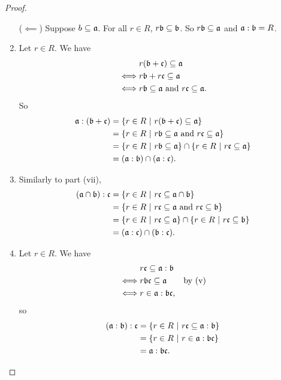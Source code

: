 \begin{proof}
\begin{enumerate}[label=(\roman*)]
      ($\impliedby$) Suppose $b \subseteq \frak a$.
      For all $r \in R$, $r \frak b \subseteq \frak b$.
      So $r \frak b \subseteq \frak a$ and $\frak a : \frak b = R$.
      
    \item
      Let $r \in R$. We have
      \begin{align*}
           & r(\frak b + \frak c) \subseteq \frak a \\
      \iff & r \frak b + r \frak c \subseteq \frak a \\
      \iff & r \frak b \subseteq \frak a \text{ and } r \frak c \subseteq \frak a.
      \end{align*}
      So
      \begin{align*}
        \frak a : (\frak b + \frak c)
          &= \{ r \in R ~|~ r(\frak b + \frak c) \subseteq \frak a \} \\
          &= \{ r \in R ~|~ r \frak b \subseteq \frak a \text{ and } r \frak c \subseteq \frak a \} \\
          &= \{ r \in R ~|~ r \frak b \subseteq \frak a \} \cap \{ r \in R ~|~ r \frak c \subseteq \frak a \} \\
          &= (\frak a : \frak b) \cap (\frak a : \frak c).
      \end{align*}
    
    \item
      Similarly to part (vii),
      \begin{align*}
        (\frak a \cap \frak b) : \frak c
          &= \{ r \in R ~|~ r \frak c \subseteq \frak a \cap \frak b \} \\
          &= \{ r \in R ~|~ r \frak c \subseteq \frak a \text{ and } r \frak c \subseteq \frak b \} \\
          &= \{ r \in R ~|~ r \frak c \subseteq \frak a \} \cap \{ r \in R ~|~ r \frak c \subseteq \frak b \} \\
          &= (\frak a : \frak c) \cap (\frak b : \frak c).
      \end{align*}
    
    \item
      Let $r \in R$. We have
      \begin{align*}
           & r \frak c \subseteq \frak a : \frak b \\
      \iff & r \frak b \frak c \subseteq \frak a & \text{by (v)} \\
      \iff & r \in \frak a : \frak b \frak c,
      \end{align*}
      so
      \begin{align*}
        (\frak a : \frak b) : \frak c
          &= \{ r \in R ~|~ r \frak c \subseteq \frak a : \frak b \} \\
          &= \{ r \in R ~|~ r \in \frak a : \frak b \frak c \} \\
          &= \frak a : \frak b \frak c.
      \end{align*}
  \end{enumerate}
\end{proof}

